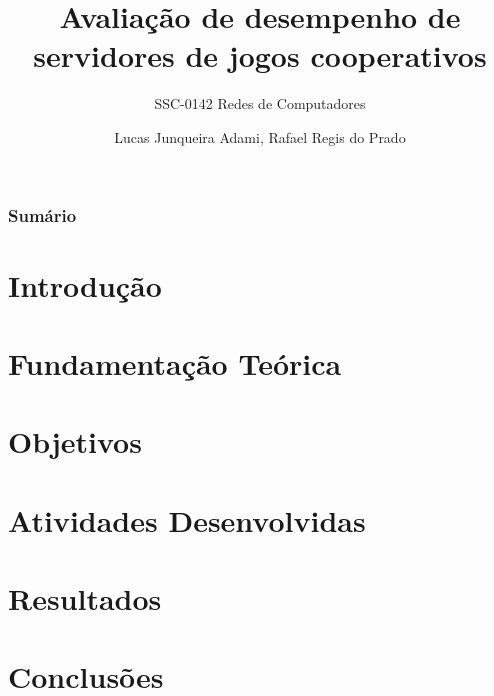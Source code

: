 \documentclass{beamer}
\title{Avaliação de desempenho de servidores de jogos cooperativos}
\subtitle{SSC-0142 Redes de Computadores}
\author{Lucas Junqueira Adami\inst{1}, Rafael Regis do Prado\inst{1}}
\institute
{
	\inst{1}
	Instituto de Ciências Matemáticas e de Computação -- Universidade de São Paulo\\
  	São Carlos, SP
}
\begin{document}
\begin{frame}[plain]
	\titlepage
\end{frame}

\begin{frame}
    \frametitle{Sumário}
    \tableofcontents
\end{frame}

\section{Introdução}

\begin{frame} \frametitle{}
	
\end{frame}

\section{Fundamentação Teórica}

\begin{frame} \frametitle{}
	
\end{frame}

\section{Objetivos}

\begin{frame} \frametitle{}
	
\end{frame}

\section{Atividades Desenvolvidas}

\begin{frame} \frametitle{}
	
\end{frame}

\section{Resultados}

\begin{frame} \frametitle{}
	
\end{frame}

\section{Conclusões}

\begin{frame} \frametitle{}
	
\end{frame}
\end{document}

